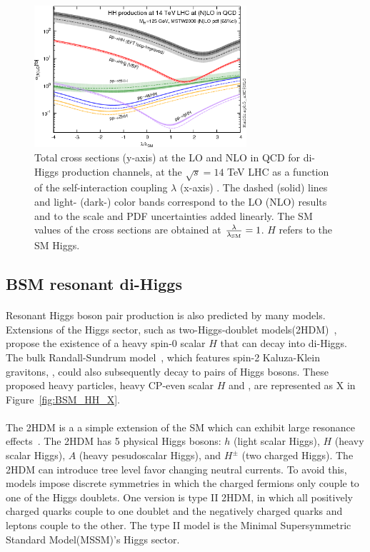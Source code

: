 \begin{figure}[h!]
  \centering
  \captionsetup{justification=centering}
  \includegraphics[width=0.7\textwidth]{figures/theory/HH_lam}
  \caption{Total cross sections (y-axis) at the LO and NLO in QCD for di-Higgs production channels, at the $\sqrt{s} = 14$ TeV LHC as a function of the self-interaction coupling $\lambda$ (x-axis) . The dashed (solid) lines and light- (dark-) color bands correspond to the LO (NLO) results and to the scale and PDF uncertainties added linearly. The SM values of the cross sections are obtained at $\frac{\rm \lambda}{\rm \lambda_{\rm SM}} = 1$. $H$ refers to the SM Higgs.}
  \label{fig:SM_HH_lam}
\end{figure}

\subsection{BSM resonant di-Higgs}
\paragraph{}
Resonant Higgs boson pair production is also predicted by many models. Extensions of the Higgs sector, such as two-Higgs-doublet models(2HDM)~\cite{PhysRevD.8.1226, Branco:2011iw}, propose the existence of a heavy spin-0 scalar $H$ that can decay into di-Higgs. The bulk Randall-Sundrum model~\cite{Agashe:2007zd, Fitzpatrick}, which features spin-2 Kaluza-Klein gravitons, \Grav, could also subsequently decay to pairs of Higgs bosons. These proposed heavy particles, heavy CP-even scalar $H$ and \Grav, are represented as X in Figure~\ref{fig:BSM_HH_X}.

\paragraph{}
The 2HDM is a a simple extension of the SM which can exhibit large resonance effects~\cite{LHCYellow}. The 2HDM has 5 physical Higgs bosons: $h$ (light scalar Higgs), $H$ (heavy scalar Higgs), $A$ (heavy pesudoscalar Higgs), and $H^{\pm}$ (two charged Higgs). The 2HDM can introduce tree level favor changing neutral currents. To avoid this, models impose discrete symmetries in which the charged fermions only couple to one of the Higgs doublets. One version is type II 2HDM, in which all positively charged quarks couple to one doublet and the negatively charged quarks and leptons couple to the other. The type II model is the Minimal Supersymmetric Standard Model(MSSM)'s Higgs sector.

